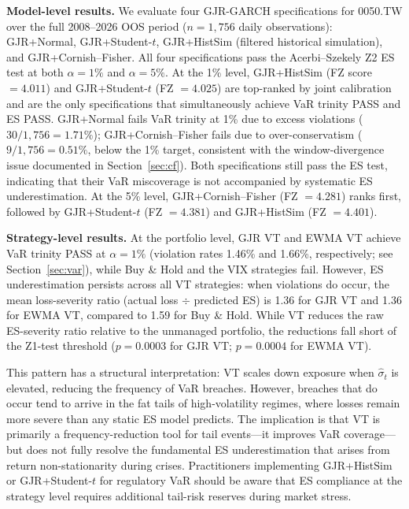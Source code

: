 \textbf{Model-level results.} We evaluate four GJR-GARCH specifications for 0050.TW over the full 2008--2026 OOS period ($n = 1{,}756$ daily observations): GJR+Normal, GJR+Student-$t$, GJR+HistSim (filtered historical simulation), and GJR+Cornish--Fisher. All four specifications pass the Acerbi--Szekely Z2 ES test at both $\alpha = 1\%$ and $\alpha = 5\%$. At the 1\% level, GJR+HistSim (FZ score $= 4.011$) and GJR+Student-$t$ (FZ $= 4.025$) are top-ranked by joint calibration and are the only specifications that simultaneously achieve VaR trinity PASS and ES PASS. GJR+Normal fails VaR trinity at 1\% due to excess violations ($30/1{,}756 = 1.71\%$); GJR+Cornish--Fisher fails due to over-conservatism ($9/1{,}756 = 0.51\%$, below the 1\% target, consistent with the window-divergence issue documented in Section~\ref{sec:cf}). Both specifications still pass the ES test, indicating that their VaR miscoverage is not accompanied by systematic ES underestimation. At the 5\% level, GJR+Cornish--Fisher (FZ $= 4.281$) ranks first, followed by GJR+Student-$t$ (FZ $= 4.381$) and GJR+HistSim (FZ $= 4.401$).

\textbf{Strategy-level results.} At the portfolio level, GJR VT and EWMA VT achieve VaR trinity PASS at $\alpha = 1\%$ (violation rates 1.46\% and 1.66\%, respectively; see Section~\ref{sec:var}), while Buy \& Hold and the VIX strategies fail. However, ES underestimation persists across all VT strategies: when violations do occur, the mean loss-severity ratio (actual loss $\div$ predicted ES) is 1.36 for GJR VT and 1.36 for EWMA VT, compared to 1.59 for Buy \& Hold. While VT reduces the raw ES-severity ratio relative to the unmanaged portfolio, the reductions fall short of the \citet{acerbi2014} Z1-test threshold ($p = 0.0003$ for GJR VT; $p = 0.0004$ for EWMA VT).

This pattern has a structural interpretation: VT scales down exposure when $\hat{\sigma}_t$ is elevated, reducing the frequency of VaR breaches. However, breaches that do occur tend to arrive in the fat tails of high-volatility regimes, where losses remain more severe than any static ES model predicts. The implication is that VT is primarily a frequency-reduction tool for tail events---it improves VaR coverage---but does not fully resolve the fundamental ES underestimation that arises from return non-stationarity during crises. Practitioners implementing GJR+HistSim or GJR+Student-$t$ for regulatory VaR should be aware that ES compliance at the strategy level requires additional tail-risk reserves during market stress.

